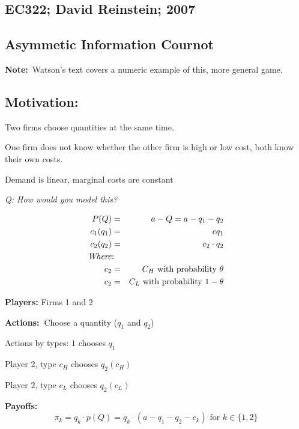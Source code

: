 \documentclass{article}
\begin{document}
\subsection{EC322; David Reinstein; 2007}

\subsection{\textbf{Asymmetic Information Cournot}\protect\bigskip }

\textbf{Note:}\ Watson's text covers a numeric example of this, more general
game.

\subsection{\textbf{Motivation}:}

Two firms choose quantities at the same time.

One firm does not know whether the other firm is high or low cost, both know
their own costs.

Demand is linear, marginal costs are constant\bigskip 

\textit{Q: How would you model this?}

\begin{eqnarray*}
P(Q) &=&a-Q=a-q_{1}-q_{2} \\
c_{1}(q_{1}) &=&cq_{1} \\
c_{2}(q_{2}) &=&c_{2}\cdot q_{2} \\
\text{\textit{Where}} &\text{: }& \\
c_{2} &=&C_{H}\text{ with probability }\theta \\
c_{2} &=&C_{L}\text{ with probability }1-\theta
\end{eqnarray*}

\bigskip

\textbf{Players: }Firms 1 and 2

\bigskip

\textbf{Actions:\ }Choose a quantity ($q_{1}$ and $q_{2}$)

\bigskip

Actions by types: $1$ chooses $q_{1}$

Player $2$, type $c_{H}$ chooses $q_{2}(c_{H})$

Player $2$, type $c_{L}$ chooses $q_{2}(c_{L})$

\bigskip

\textbf{Payoffs: }%
\[
\pi _{k}=q_{k}\cdot p(Q)=q_{k}\cdot (a-q_{1}-q_{2}-c_{k})\text{ for }k\in
\{1,2\} 
\]
\end{document}
